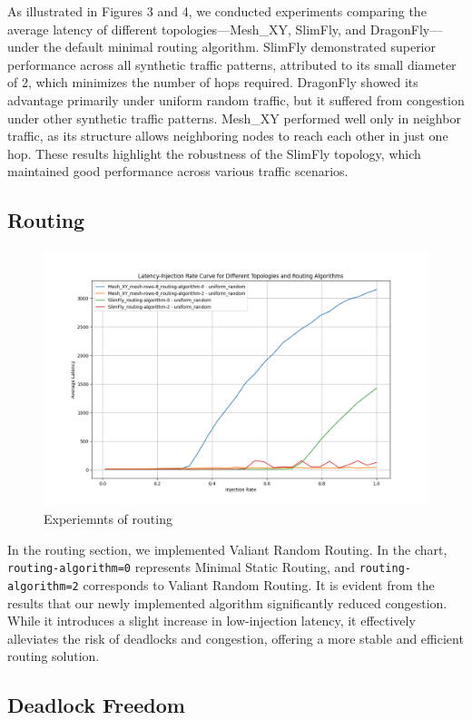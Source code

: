 \documentclass[utf8]{article}
\begin{document}
As illustrated in Figures 3 and 4, we conducted experiments comparing the average latency of different topologies—Mesh\_XY, SlimFly, and DragonFly—under the default minimal routing algorithm. SlimFly demonstrated superior performance across all synthetic traffic patterns, attributed to its small diameter of 2, which minimizes the number of hops required. DragonFly showed its advantage primarily under uniform random traffic, but it suffered from congestion under other synthetic traffic patterns. Mesh\_XY performed well only in neighbor traffic, as its structure allows neighboring nodes to reach each other in just one hop. These results highlight the robustness of the SlimFly topology, which maintained good performance across various traffic scenarios.

\subsection{Routing}

\begin{figure}[H]
    \centering
    \includegraphics[width=0.85\linewidth]{routing.png}
    \caption{Experiemnts of routing}
\end{figure}

In the routing section, we implemented Valiant Random Routing. In the chart, \texttt{routing-algorithm=0} represents Minimal Static Routing, and \texttt{routing-algorithm=2} corresponds to Valiant Random Routing. It is evident from the results that our newly implemented algorithm significantly reduced congestion. While it introduces a slight increase in low-injection latency, it effectively alleviates the risk of deadlocks and congestion, offering a more stable and efficient routing solution.

\subsection{Deadlock Freedom}
\end{document}

